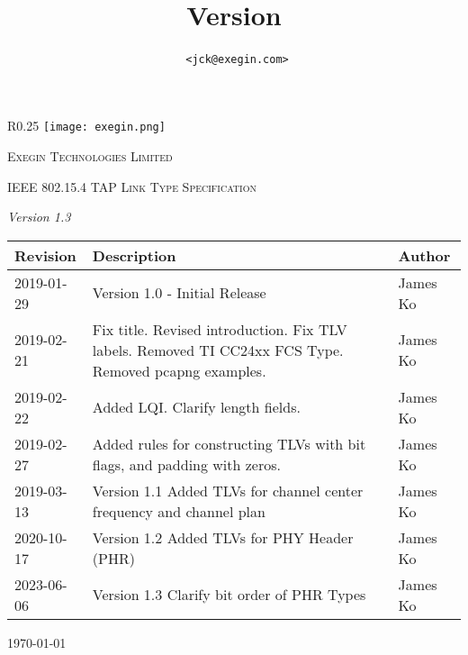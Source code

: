 \documentclass[12pt]{article}
\title{
\maintitle
\\\company
\\\hfill\\\normalsize Version \versionnumber
}
\author{\authorname~\tt{<jck@exegin.com>}}
\newcommand\versionnumber{1.3}
\renewcommand\_{\textunderscore\allowbreak}
\begin{document}
\begin{titlepage}
    \vspace{5cm}
    \begin{wrapfigure}{R}{0.25\textwidth}
        \texttt{[image: exegin.png]}
    \end{wrapfigure}
    \vspace{2cm}
    {\scshape\LARGE Exegin Technologies Limited \par}
    \vspace{5cm}
    {\scshape\Large IEEE 802.15.4 TAP Link Type Specification\par}
    {\itshape Version \versionnumber}
    \vspace{2cm}
    \vfill

    \vfill

    \begin{tabular}{|p{2cm}|p{11.5cm}| p{3cm}|}
\hline
    \textbf{Revision} & \textbf{Description} & \textbf{Author}\\
\hline
    2019-01-29 & Version 1.0 - Initial Release & James Ko\\
\hline
    2019-02-21 & Fix title. Revised introduction. Fix TLV labels.
    Removed TI CC24xx FCS Type. Removed pcapng examples. & James Ko\\
\hline
    2019-02-22 & Added LQI. Clarify length fields. & James Ko\\
\hline
    2019-02-27 & Added rules for constructing TLVs with bit flags, and padding
        with zeros.  & James Ko\\
\hline
    2019-03-13 & Version 1.1 Added TLVs for channel center frequency and
        channel plan & James Ko\\ \hline
\hline
    2020-10-17 & Version 1.2 Added TLVs for PHY Header (PHR) & James Ko\\
\hline
    2023-06-06 & Version 1.3 Clarify bit order of PHR Types & James Ko\\
\hline
\end{tabular}

    {\large \today\par}
\end{titlepage}

\newpage
\tableofcontents

\newpage
\end{document}
